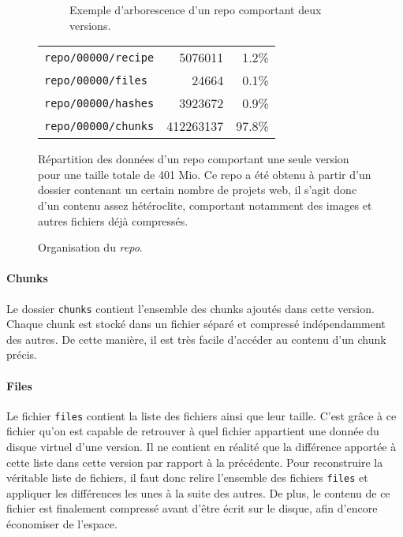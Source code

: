 \documentclass[a4paper]{report}
\begin{document}
\begin{figure*}[ht]
\centering

\begin{subfigure}[c]{.34\textwidth}
  \caption{Exemple d'arborescence d'un repo comportant deux versions.}
  \label{fig:repo-dir-tree}
\end{subfigure}
\hfill
\begin{subtable}[c]{.55\textwidth}
  \centering
  \begin{tabular}{l r r}
  \verb|repo/00000/recipe| &   5076011 &   1.2\% \\
  \verb|repo/00000/files| &      24664 &   0.1\% \\
  \verb|repo/00000/hashes| &   3923672 &   0.9\% \\
  \verb|repo/00000/chunks| & 412263137 &  97.8\% \\
  \end{tabular}
  \caption{
    Répartition des données d'un repo comportant une seule version pour une taille totale de 401 Mio.
    Ce repo a été obtenu à partir d'un dossier contenant un certain nombre de projets web,
    il s'agit donc d'un contenu assez hétéroclite, comportant notamment des images et autres fichiers déjà compressés.
  }
  \label{tab:repo-data-distribution}
\end{subtable}

\caption{Organisation du \emph{repo}.}
\label{fig:repo-organisation}
\end{figure*}

\paragraph{Chunks}
Le dossier \verb|chunks| contient l'ensemble des chunks ajoutés dans cette version.
Chaque chunk est stocké dans un fichier séparé et compressé indépendamment des autres.
De cette manière, il est très facile d'accéder au contenu d'un chunk précis.

\paragraph{Files}
Le fichier \verb|files| contient la liste des fichiers ainsi que leur taille.
C'est grâce à ce fichier qu'on est capable de retrouver
à quel fichier appartient une donnée du disque virtuel d'une version.
Il ne contient en réalité que la différence apportée à cette liste dans cette version
par rapport à la précédente.
Pour reconstruire la véritable liste de fichiers,
il faut donc relire l'ensemble des fichiers \verb|files|
et appliquer les différences les unes à la suite des autres.
De plus, le contenu de ce fichier est finalement compressé avant d'être écrit sur le disque,
afin d'encore économiser de l'espace.
\end{document}
